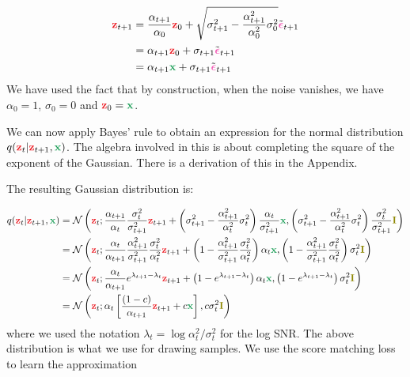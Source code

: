 \documentclass[usenames,dvipsnames]{article}
\newcommand{\myvec}[1]{\mathbf{#1}}
\newcommand{\myvecsym}[1]{\boldsymbol{#1}}
\newcommand{\vx}{\myvec{\textcolor{ForestGreen}{x}}}
\newcommand{\vz}{\myvec{\textcolor{Red}{z}}}
\newcommand{\vI}{\myvec{\textcolor{olive}{I}}}
\newcommand{\vepsilon}{\myvecsym{\textcolor{CarnationPink}{\epsilon}}}
\begin{document}
\begin{align}
\vz_{t+1} &=  \frac{\alpha_{t+1}}{\alpha_{0}} \vz_{0} +   \sqrt{\sigma_{t+1}^2 - \frac{\alpha_{t+1}^2}{\alpha_{0}^2} \sigma_{0}^2} \tilde{\vepsilon}_{t+1} \nonumber \\
&=  \alpha_{t+1} \vz_{0} + \sigma_{t+1} \tilde{\vepsilon}_{t+1} \nonumber \\
&=  \alpha_{t+1} \vx + \sigma_{t+1} \tilde{\vepsilon}_{t+1} \nonumber
\end{align}
We have used the fact that by construction, when the noise vanishes, we have $\alpha_0 = 1$, $\sigma_0 = 0$ and $\vz_0 = \vx$.

We can now apply Bayes' rule to obtain an expression for the normal distribution $q(\vz_{t}|\vz_{t+1},\vx)$. The algebra involved in this is about completing the square of the exponent of the Gaussian. There is a derivation of this in the Appendix.

The resulting Gaussian distribution is:

\begin{align}
q(\vz_{t}|\vz_{t+1}, \vx) &= \mathcal{N}\left(\vz_{t};  
\frac{\alpha_{t+1}}{\alpha_{t}} \frac{\sigma_{t}^2}{\sigma_{t+1}^2} \vz_{t+1}
+ \left(\sigma_{t+1}^2 - \frac{\alpha_{t+1}^2}{\alpha_t^2} \sigma_t^2\right)  \frac{\alpha_{t}}{\sigma^2_{t+1}} \vx,
\left(\sigma_{t+1}^2 - \frac{\alpha_{t+1}^2}{\alpha_t^2} \sigma_t^2\right) \frac{\sigma_{t}^2}{\sigma_{t+1}^2} \vI\right) \nonumber \\
&=
\mathcal{N}\left(\vz_{t};  
\frac{\alpha_{t}}{\alpha_{t+1}} \frac{\alpha_{t+1}^2}{\sigma_{t+1}^2} \frac{\sigma_{t}^2}{\alpha_{t}^2} \vz_{t+1}
+ \left(1 - \frac{\alpha_{t+1}^2}{\sigma_{t+1}^2} \frac{\sigma_t^2}{\alpha_t^2}\right)  \alpha_{t} \vx,
\left( 1 - \frac{\alpha_{t+1}^2}{\sigma_{t+1}^2} \frac{\sigma_t^2}{\alpha_t^2}\right) \sigma_{t}^2
\vI\right) \nonumber \\
&=
\mathcal{N}\left(\vz_{t};  
\frac{\alpha_{t}}{\alpha_{t+1}}
e^{\lambda_{t+1} - \lambda_t }
\vz_{t+1}
+ \left(1 - e^{\lambda_{t+1} - \lambda_t } \right)  \alpha_{t} \vx,
\left(1 - e^{\lambda_{t+1} - \lambda_t } \right) \sigma_{t}^2
\vI\right) \nonumber \\
&=
\mathcal{N}\left(\vz_{t};  
\alpha_{t} \left[
\frac{(1-c)}{\alpha_{t+1}}
\vz_{t+1}
+ c \vx \right],
c \sigma_{t}^2
\vI\right)
\end{align}
where we used the notation $\lambda_t = \log \alpha_t^2/\sigma_t^2$ for the log SNR.
The above distribution is what we use for drawing samples. We use the score matching loss to learn the approximation
\end{document}
